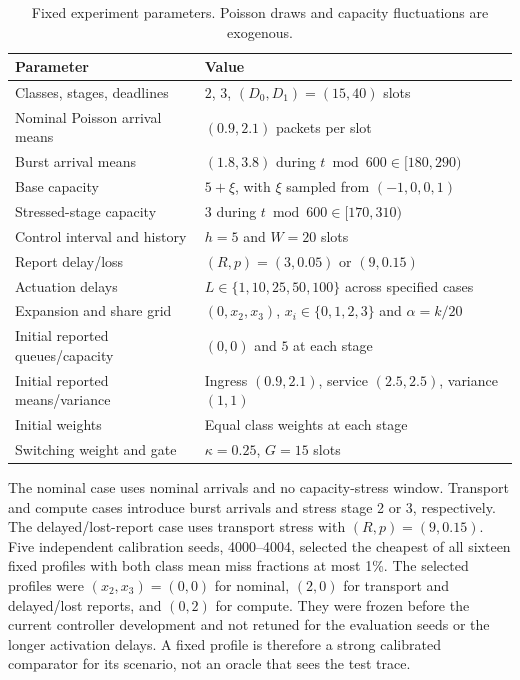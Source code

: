 \documentclass[10pt,a4paper]{article}
\begin{document}
\begin{table}[htbp]\centering\small
\caption{Fixed experiment parameters. Poisson draws and capacity fluctuations are exogenous.}
\begin{tabular}{p{59mm}p{90mm}}\toprule
Parameter & Value\\\midrule
Classes, stages, deadlines & $2$, $3$, $(D_0,D_1)=(15,40)$ slots\\
Nominal Poisson arrival means & $(0.9,2.1)$ packets per slot\\
Burst arrival means & $(1.8,3.8)$ during $t\bmod600\in[180,290)$\\
Base capacity & $5+\xi$, with $\xi$ sampled from $(-1,0,0,1)$\\
Stressed-stage capacity & $3$ during $t\bmod600\in[170,310)$\\
Control interval and history & $h=5$ and $W=20$ slots\\
Report delay/loss & $(R,p)=(3,0.05)$ or $(9,0.15)$\\
Actuation delays & $L\in\{1,10,25,50,100\}$ across specified cases\\
Expansion and share grid & $(0,x_2,x_3)$, $x_i\in\{0,1,2,3\}$ and $\alpha=k/20$\\
Initial reported queues/capacity & $(0,0)$ and $5$ at each stage\\
Initial reported means/variance & Ingress $(0.9,2.1)$, service $(2.5,2.5)$, variance $(1,1)$\\
Initial weights & Equal class weights at each stage\\
Switching weight and gate & $\kappa=0.25$, $G=15$ slots\\\bottomrule
\end{tabular}
\end{table}

The nominal case uses nominal arrivals and no capacity-stress window.
Transport and compute cases introduce burst arrivals and stress stage 2 or 3,
respectively. The delayed/lost-report case uses transport stress with $(R,p)=(9,0.15)$.
Five independent calibration seeds, 4000--4004, selected the cheapest of all
sixteen fixed profiles with both class mean miss fractions at most 1\%.
The selected profiles were $(x_2,x_3)=(0,0)$ for nominal, $(2,0)$ for transport
and delayed/lost reports, and $(0,2)$ for compute. They were frozen before the
current controller development and not retuned for the evaluation seeds or
the longer activation delays. A fixed profile is therefore a strong calibrated
comparator for its scenario, not an oracle that sees the test trace.
\end{document}
